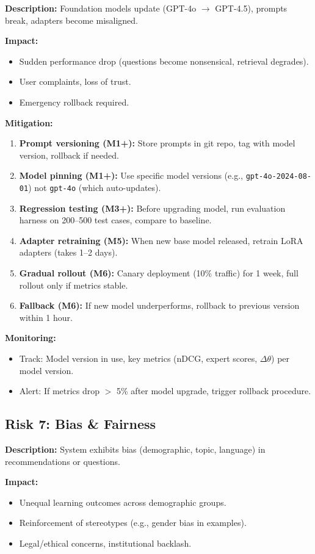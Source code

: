 \documentclass[11pt,letterpaper]{article}
\begin{document}
\textbf{Description:} Foundation models update (GPT-4o $\rightarrow$ GPT-4.5), prompts break, adapters become misaligned.

\textbf{Impact:}
\begin{itemize}
\item Sudden performance drop (questions become nonsensical, retrieval degrades).
\item User complaints, loss of trust.
\item Emergency rollback required.
\end{itemize}

\textbf{Mitigation:}
\begin{enumerate}
\item \textbf{Prompt versioning (M1+):} Store prompts in git repo, tag with model version, rollback if needed.
\item \textbf{Model pinning (M1+):} Use specific model versions (e.g., \texttt{gpt-4o-2024-08-01}) not \texttt{gpt-4o} (which auto-updates).
\item \textbf{Regression testing (M3+):} Before upgrading model, run evaluation harness on 200--500 test cases, compare to baseline.
\item \textbf{Adapter retraining (M5):} When new base model released, retrain LoRA adapters (takes 1--2 days).
\item \textbf{Gradual rollout (M6):} Canary deployment (10\% traffic) for 1 week, full rollout only if metrics stable.
\item \textbf{Fallback (M6):} If new model underperforms, rollback to previous version within 1 hour.
\end{enumerate}

\textbf{Monitoring:}
\begin{itemize}
\item Track: Model version in use, key metrics (nDCG, expert scores, $\Delta\theta$) per model version.
\item Alert: If metrics drop $>$ 5\% after model upgrade, trigger rollback procedure.
\end{itemize}

\subsection{Risk 7: Bias \& Fairness}\label{subsec:risk-7-bias}

\textbf{Description:} System exhibits bias (demographic, topic, language) in recommendations or questions.

\textbf{Impact:}
\begin{itemize}
\item Unequal learning outcomes across demographic groups.
\item Reinforcement of stereotypes (e.g., gender bias in examples).
\item Legal/ethical concerns, institutional backlash.
\end{itemize}
\end{document}
